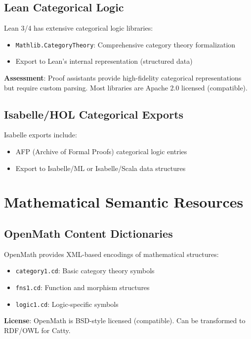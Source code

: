 \subsection{Lean Categorical Logic}

Lean 3/4 has extensive categorical logic libraries:
\begin{itemize}
  \item \texttt{Mathlib.CategoryTheory}: Comprehensive category theory formalization
  \item Export to Lean's internal representation (structured data)
\end{itemize}

\textbf{Assessment}: Proof assistants provide high-fidelity categorical representations but require custom parsing. Most libraries are Apache 2.0 licensed (compatible).

\subsection{Isabelle/HOL Categorical Exports}

Isabelle exports include:
\begin{itemize}
  \item AFP (Archive of Formal Proofs) categorical logic entries
  \item Export to Isabelle/ML or Isabelle/Scala data structures
\end{itemize}

\section{Mathematical Semantic Resources}

\subsection{OpenMath Content Dictionaries}

OpenMath provides XML-based encodings of mathematical structures:
\begin{itemize}
  \item \texttt{category1.cd}: Basic category theory symbols
  \item \texttt{fns1.cd}: Function and morphism structures
  \item \texttt{logic1.cd}: Logic-specific symbols
\end{itemize}

\textbf{License}: OpenMath is BSD-style licensed (compatible). Can be transformed to RDF/OWL for Catty.


